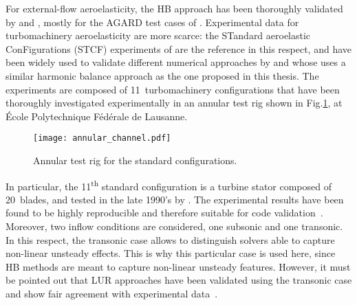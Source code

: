
For external-flow aeroelasticity, the HB approach has 
been thoroughly validated by \citet{Gopinath2005, Woodgate2009} and \citet{JDufour2009}, 
mostly for the AGARD test cases of \citet{Davis1982}.
Experimental data for turbomachinery aeroelasticity are more scarce: 
the STandard aeroelastic ConFigurations (STCF) experiments 
of \citet{Fransson1999} are the 
reference in this respect, and have been widely used 
to validate different numerical approaches by \citet{Sbardella2001,
Duta2002,Campobasso2003,Cinnella2004} and \citet{Huang2013a} whose
uses a similar harmonic balance approach as the one proposed in
this thesis.
The experiments
are composed of 11~turbomachinery configurations that have been
thoroughly investigated experimentally in an 
annular test rig shown in Fig.\ref{fig:annular_channel}, at \'Ecole 
Polytechnique F\'ed\'erale de Lausanne.
\begin{figure}[htbp]
  \centering
  \texttt{[image: annular\_channel.pdf]}
  \caption{Annular test rig for the standard configurations.}
  \label{fig:annular_channel}
\end{figure}

In particular, the 11\textsuperscript{th} standard configuration is a
turbine stator composed of 20~blades, and tested
in the late 1990's by \citet{Fransson1999}.
The experimental results have been found to be highly reproducible and
therefore suitable for code validation~\cite{Fransson1999}.  Moreover,
two inflow conditions are considered, one subsonic and one transonic.
In this respect, the transonic case allows to distinguish
solvers able to capture non-linear unsteady effects. This is why this particular
case is used here, since HB methods are meant to capture non-linear unsteady
features. However, it must be pointed out that LUR approaches have
been validated using the transonic case and show fair agreement with experimental
data~\cite{Sbardella2001, Duta2002,Campobasso2003}.

